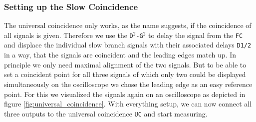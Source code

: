 \documentclass[11pt,a4paper,notitlepage]{scrartcl}
\begin{document}
\subsubsection{Setting up the Slow Coincidence}
The universal coincidence only works, as the name suggests, if the coincidence of all signals is given. Therefore we use the \texttt{D$^2$-G$^2$} to delay the signal from the \texttt{FC} and displace the individual slow branch signals with their associated delays \texttt{D1/2} in a way, that the signals are coincident and the leading edges match up. In principle we only need maximal alignment of the two signals. But to be able to set a coincident point for all three signals of which only two could be displayed simultaneously on the oscilloscope we chose the leading edge as an easy reference point. For this we visualized the signals again on an oscilloscope as depicted in figure \ref{fig:universal_coincidence}. With everything setup, we can now connect all three outputs to the universal coincidence \texttt{UC} and start measuring.
\end{document}
